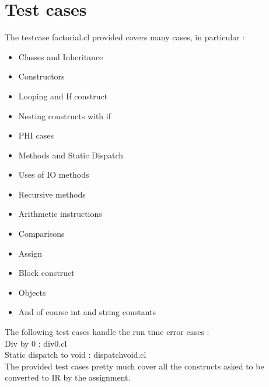\documentclass{article}
\begin{document}
\section{Test cases}

The testcase factorial.cl provided covers many cases, in particular :
\begin{itemize}
	\item Classes and Inheritance
	\item Constructors
	\item Looping and If construct
	\item Nesting constructs with if 
	\item PHI cases 
	\item Methods and Static Dispatch
	\item Uses of IO methods
	\item Recursive methods
	\item Arithmetic instructions
	\item Comparisons
	\item Assign 
	\item Block construct
	\item Objects
	\item And of course int and string constants
\end{itemize}


The following test cases handle the run time error cases :\\
Div by 0 : div0.cl\\
Static dispatch to void : dispatchvoid.cl\\

The provided test cases pretty  much cover all the constructs asked to be converted to IR by the assignment.
\end{document}
